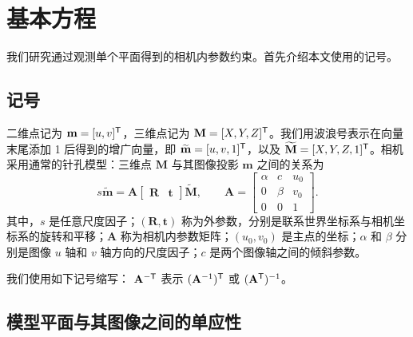 \section{基本方程}

我们研究通过观测单个平面得到的相机内参数约束。首先介绍本文使用的记号。

\subsection{记号}

二维点记为
$\mathbf m=[u,v]^{\mathsf{T}}$，三维点记为
$\mathbf M=[X,Y,Z]^{\mathsf{T}}$。我们用波浪号表示在向量末尾添加 1 后得到的增广向量，即
$\widetilde{\mathbf m}=[u,v,1]^{\mathsf{T}}$，以及
$\widetilde{\mathbf M}=[X,Y,Z,1]^{\mathsf{T}}$。相机采用通常的针孔模型：三维点 $\mathbf M$ 与其图像投影 $\mathbf m$ 之间的关系为
\begin{equation}
    s\widetilde{\mathbf m}=\mathbf A
    \begin{bmatrix}\mathbf R & \mathbf t\end{bmatrix}
    \widetilde{\mathbf M},
    \qquad
    \mathbf A=\begin{bmatrix}
        \alpha & c & u_0\\
        0 & \beta & v_0\\
        0 & 0 & 1
    \end{bmatrix}.
    \label{eq:pinhole}
\end{equation}
其中，$s$ 是任意尺度因子；$(\mathbf R,\mathbf t)$ 称为外参数，分别是联系世界坐标系与相机坐标系的旋转和平移；$\mathbf A$ 称为相机内参数矩阵；$(u_0,v_0)$ 是主点的坐标；$\alpha$ 和 $\beta$ 分别是图像 $u$ 轴和 $v$ 轴方向的尺度因子；$c$ 是两个图像轴之间的倾斜参数。

我们使用如下记号缩写：
$\mathbf A^{-\mathsf{T}}$ 表示 $(\mathbf A^{-1})^{\mathsf{T}}$ 或 $(\mathbf A^{\mathsf{T}})^{-1}$。

\subsection{模型平面与其图像之间的单应性}

